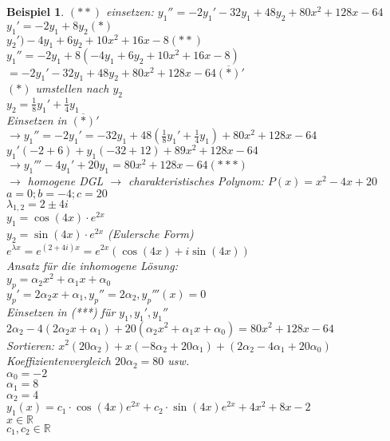 \documentclass[fontset=ubuntu,12pt,a4paper]{scrreprt}
\newtheorem{beispiel}[defi]{Beispiel}
\begin{document}
\begin{beispiel}
         \((**)\) einsetzen: \({y_1}'' = -2{y_1}'-32y_1+48y_2+80x^2+128x-64\) \\
         \( y_1'=-2y_1+8y_2 (*) \) \\
         \(y_2')-4y_1+6y_2+10x^2+16x-8 (**) \) \\
         \( y_1''=-2y_1+8(-4y_1+6y_2+10x^2+16x-8) \) \\
         \( =-2y_1'-32y_1+48y_2+80x^2+128x-64  \overline{(*)}' \) \\
         \( (*) \) umstellen nach \( y_2 \) \\ 
         \( y_2=\frac{1}{8}y_1'+\frac{1}{4}y_1 \) \\
         Einsetzen in \( \overline{(*)}' \) \\
         \( \rightarrow y_1''=-2y_1'=-32y_1+48(\frac{1}{8}y_1'+\frac{1}{4}y_1) + 80x^2+128x-64 \) \\
         \(y_1'(-2+6)+y_1(-32+12)+89x^2+128x-64 \) \\
         \(\rightarrow y_1'''-4y_1'+20y_1=80x^2+128x-64 (***) \) \\
         \(\rightarrow \) homogene DGL \(\rightarrow \) charakteristisches Polynom: \(P(x)=x^2-4x+20 \) \\
         \(a=0; b=-4;c=20\) \\
         \(\lambda_{1,2}=2\pm4i \) \\
         \(y_1=\cos(4x)\cdot e^{2x} \) \\
         \(y_2=\sin(4x)\cdot e^{2x} \) (Eulersche Form)\\
         \(e^{\lambda x}=e^{(2+4i)x}=e^{2x}(\cos(4x)+i\sin(4x)) \) \\
         Ansatz für die inhomogene Lösung: \\
         \(y_p=\alpha_2x^2+\alpha_1x+\alpha_0 \) \\
         \(y_p'=2\alpha_2x+\alpha_1, y_p''=2\alpha_2, y_p'''(x)=0 \) \\
         Einsetzen in (***) für \(y_1, y_1', y_1''\) \\
         \( 2\alpha_2-4(2\alpha_2x+\alpha_1)+20(\alpha_2x^2+\alpha_1x+\alpha_0) = 80x^2+128x-64 \) \\
         Sortieren: \(x^2(20\alpha_2)+x(-8\alpha_2+20\alpha_1)+(2\alpha_2-4\alpha_1+20\alpha_0)\)
         \\ Koeffizientenvergleich \(20\alpha_2 = 80 \) usw. \\
         \(\alpha_0=-2 \)\\
         \(\alpha_1=8 \)\\
         \(\alpha_2=4 \)\\
         \( y_1(x)=c_1\cdot\cos(4x)e^{2x}+c_2\cdot\sin(4x)e^{2x}+4x^2+8x-2\) \\ \(x\in\mathbb{R}\) \\ \(c_1,c_2\in\mathbb{R}\)
         
         
     \end{beispiel}
\end{document}
